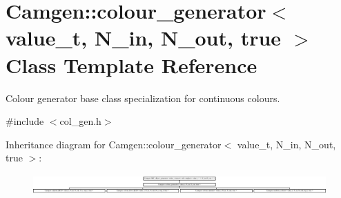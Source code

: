 \hypertarget{a00084}{\section{Camgen\-:\-:colour\-\_\-generator$<$ value\-\_\-t, N\-\_\-in, N\-\_\-out, true $>$ Class Template Reference}
\label{a00084}
}


Colour generator base class specialization for continuous colours.  




{\ttfamily \#include $<$col\-\_\-gen.\-h$>$}

Inheritance diagram for Camgen\-:\-:colour\-\_\-generator$<$ value\-\_\-t, N\-\_\-in, N\-\_\-out, true $>$\-:\begin{figure}[H]
\begin{center}
\leavevmode
\includegraphics[height=0.760870cm]{a00084}
\end{center}
\end{figure}
